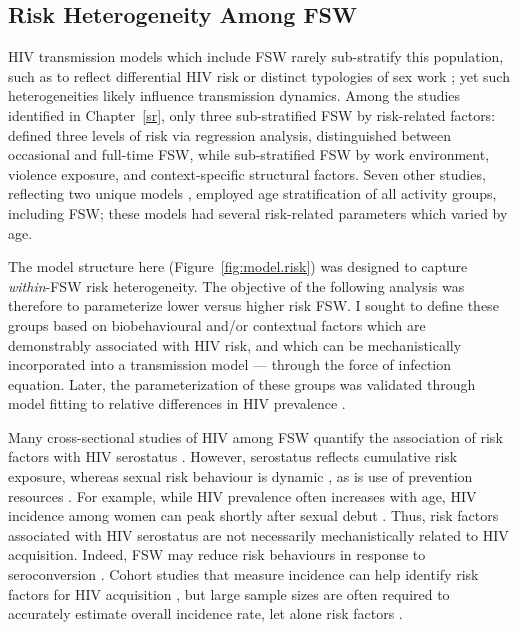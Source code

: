 \subsection{Risk Heterogeneity Among FSW}\label{model.par.fsw}
HIV transmission models which include FSW rarely sub-stratify this population, such as to reflect
differential HIV risk or distinct typologies of sex work \cite{Blanchard2008,Scorgie2012};
yet such heterogeneities likely influence transmission dynamics.
Among the studies identified in Chapter~\ref{sr},
only three sub-stratified FSW by risk-related factors:
\citet{Cremin2017} defined three levels of risk via regression analysis,
\citet{Low2015} distinguished between occasional and full-time FSW, while
\citet{Shannon2015} sub-stratified FSW by
work environment, violence exposure, and context-specific structural factors.
Seven other studies, reflecting two unique models \cite{Johnson2012,Maheu-Giroux2017},
employed age stratification of all activity groups, including FSW;
these models had several risk-related parameters which varied by age.
\par
The model structure here (Figure~\ref{fig:model.risk})
was designed to capture \emph{within}-FSW risk heterogeneity.
The objective of the following analysis was therefore to parameterize
lower versus higher risk FSW.
I sought to define these groups based on biobehavioural and/or contextual factors
which are demonstrably associated with HIV risk,
and which can be mechanistically incorporated into a transmission model ---
\ie through the force of infection equation.
Later, the parameterization of these groups was validated through model fitting
to relative differences in HIV prevalence .
\par
Many cross-sectional studies of HIV among FSW quantify
the association of risk factors with HIV serostatus
\cite{Aklilu2001,Dunkle2005,Scorgie2012,Jonas2020}.
However, serostatus reflects cumulative risk exposure,
whereas sexual risk behaviour is dynamic \cite{Watts2010,vanWees2020},
as is use of prevention resources \cite{Roberts2020}.
For example, while HIV prevalence often increases with age,
HIV incidence among women can peak shortly after sexual debut \cite{Dellar2015}.
Thus, risk factors associated with HIV serostatus are not necessarily
mechanistically related to HIV acquisition.
Indeed, FSW may reduce risk behaviours in response to seroconversion \cite{McClelland2006}.
Cohort studies that measure incidence
can help identify risk factors for HIV acquisition \cite{McKinnon2015,Nouaman2022},
but large sample sizes are often required to accurately estimate overall incidence rate,
let alone risk factors \cite{Priddy2011}.
